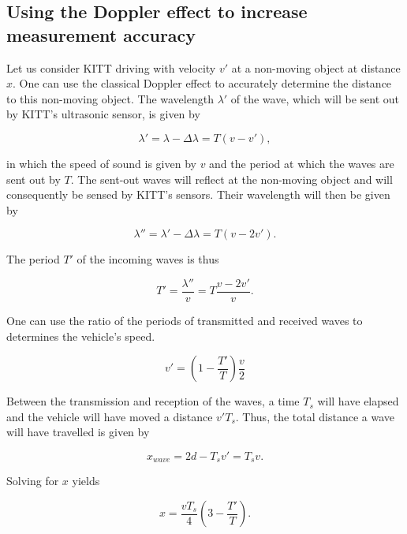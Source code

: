 \documentclass[11pt,titlepage]{report}
\begin{document}
\subsection{Using the Doppler effect to increase measurement accuracy}
\label{ssec:control-doppler}
Let us consider KITT driving with velocity $v'$ at a non-moving object at distance $x$. One can use the classical Doppler effect to accurately determine the distance to this non-moving object. The wavelength $\lambda'$ of the wave, which will be sent out by KITT's ultrasonic sensor, is given by

\begin{equation}
	\lambda' = \lambda - \Delta \lambda = T (v - v'),
\end{equation}

in which the speed of sound is given by $v$ and the period at which the waves are sent out by $T$. The sent-out waves will reflect at the non-moving object and will consequently be sensed by KITT's sensors. Their wavelength will then be given by

\begin{equation}
	\lambda'' = \lambda' - \Delta \lambda = T (v - 2 v').
\end{equation}

The period $T'$ of the incoming waves is thus

\begin{equation}
	T' = \frac{\lambda''}{v} = T \frac{v - 2 v'}{v}.
\end{equation}

One can use the ratio of the periods of transmitted and received waves to determines the vehicle's speed.

\begin{equation} \label{eq:ass-2-vel-car}
 	v' = \left(1-\frac{T'}{T} \right) \frac{v}{2}
 \end{equation}

Between the transmission and reception of the waves, a time $T_s$ will have elapsed and the vehicle will have moved a distance $v' T_s$. Thus, the total distance a wave will have travelled is given by

\begin{equation}
	x_{wave} = 2 d - T_s v' = T_s v.
\end{equation}

Solving for $x$ yields

\begin{equation} \label{eq:ass-2-pre-dist-car}
	x = \frac{v T_s}{4} \left(3 - \frac{T'}{T} \right).
\end{equation}
\end{document}
